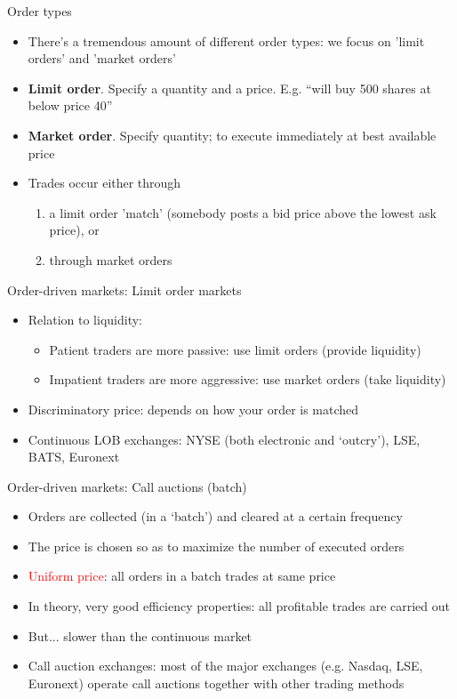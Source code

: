 \documentclass[english,10pt
,aspectratio=169
]{beamer}
\begin{document}
\begin{frame}{Order types}
\begin{itemize}
	\item There's a tremendous amount of different order types: we focus on 'limit orders' and 'market orders'
	\item \textbf{Limit order}. Specify a quantity and a price. E.g. ``will buy 500 shares at below price 40''
	\item \textbf{Market order}. Specify quantity; to execute immediately at best available price
	\item Trades occur either through 
	\begin{enumerate}
		\item a limit order 'match' (somebody posts a bid price above the lowest ask price), or
		\item through market orders
	\end{enumerate}
\end{itemize}
\end{frame}


\begin{frame}{Order-driven markets: Limit order markets}
\begin{itemize}
	\item Relation to liquidity:
	\begin{itemize}
		\item Patient traders are more passive: use limit orders (provide liquidity)
		\item Impatient traders are more aggressive: use market orders (take liquidity)
	\end{itemize}
	\item \alert{Discriminatory price}: depends on how your order is matched
	\item Continuous LOB exchanges: NYSE (both electronic and `outcry'), LSE, BATS, Euronext
\end{itemize}
\end{frame}


\begin{frame}{Order-driven markets: Call auctions (batch)}
\begin{itemize}
	\item Orders are collected (in a `batch') and cleared at a certain frequency
	\item The price is chosen so as to maximize the number of executed orders
	\item \textcolor{red}{Uniform price}: all orders in a batch trades at same price
	\item In theory,  very good efficiency properties: all profitable trades are carried out
	\item But... slower than the continuous market
	\item Call auction exchanges: most of the major exchanges (e.g. Nasdaq, LSE, Euronext) operate call auctions together with other trading methods
\end{itemize}
\end{frame}
\end{document}
